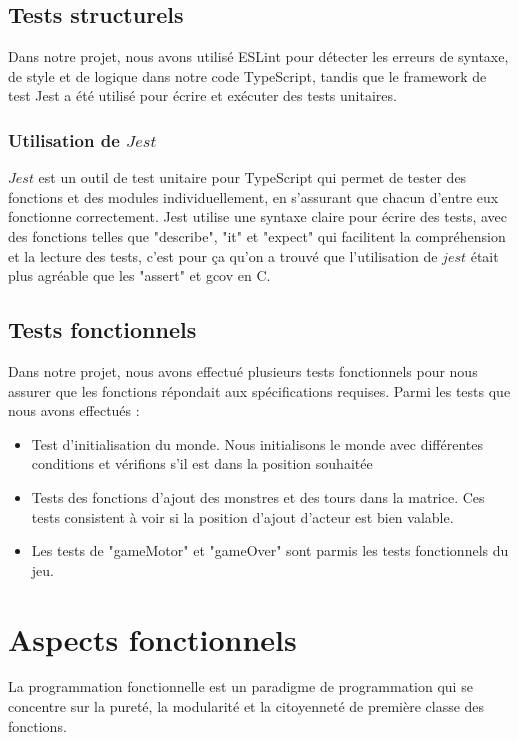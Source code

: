 \documentclass[11pt]{article}
\begin{document}
        \subsection{Tests structurels}
Dans notre projet, nous avons utilisé ESLint pour détecter les erreurs de syntaxe, de style et de logique dans notre code TypeScript, tandis que le framework de test Jest a été utilisé pour écrire et exécuter des tests unitaires.
        \subsubsection{Utilisation de $Jest$}
                $Jest$ est un outil de test unitaire pour TypeScript qui permet de tester des fonctions et des modules individuellement, en s'assurant que chacun d'entre eux fonctionne correctement. Jest utilise une syntaxe claire pour écrire des tests, avec des fonctions telles que "describe", "it" et "expect" qui facilitent la compréhension et la lecture des tests, c'est pour ça qu'on a trouvé que l'utilisation de $jest$ était plus agréable que les "assert" et gcov en C.
        \subsection{Tests fonctionnels}
    Dans notre projet, nous avons effectué plusieurs tests fonctionnels pour nous assurer que les fonctions répondait aux spécifications requises. Parmi les tests que nous avons effectués : 
      \begin{itemize}
    \item Test d'initialisation du monde. Nous initialisons le monde avec différentes conditions et vérifions s'il est dans la position souhaitée 
    \item  Tests des fonctions d'ajout des monstres et des tours dans la matrice.
Ces tests consistent à voir si la position d'ajout d'acteur est bien valable.
    \item Les tests de "gameMotor" et "gameOver" sont parmis les tests fonctionnels du jeu. 
\end{itemize}


    \section{Aspects fonctionnels}
    La programmation fonctionnelle est un paradigme de programmation qui se concentre sur la pureté, la modularité et la citoyenneté de première classe des fonctions.
\end{document}
